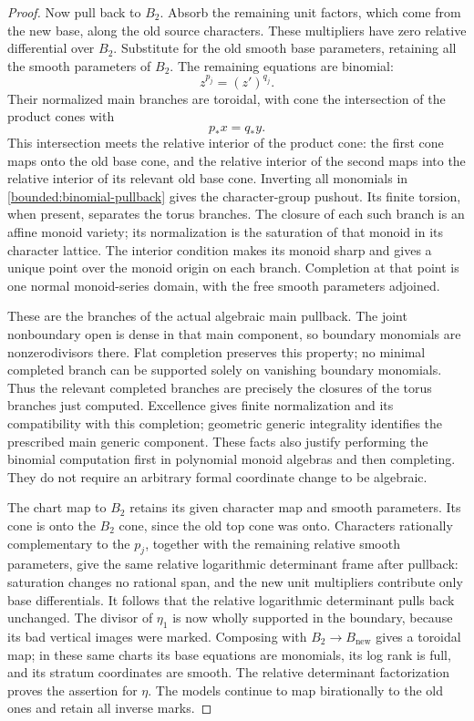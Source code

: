 \begin{proof}
Now pull back to \(B_2\).  Absorb the remaining unit factors, which come
from the new base, along the old source characters.  These multipliers
have zero relative differential over \(B_2\).  Substitute for the old
smooth base parameters, retaining all the smooth parameters of
\(B_2\).  The remaining equations are binomial:
\begin{equation}
 z^{p_j}=(z')^{q_j}.
 \label{bounded:binomial-pullback}
\end{equation}
Their normalized main branches are toroidal, with cone the intersection
of the product cones with
\[
 p_*x=q_*y.
\]
This intersection meets the relative interior of the product cone:
the first cone maps onto the old base cone, and the relative interior
of the second maps into the relative interior of its relevant old
base cone.  Inverting all monomials in
\eqref{bounded:binomial-pullback} gives the character-group pushout.
Its finite torsion, when present, separates the torus branches.  The
closure of each such branch is an affine monoid variety; its
normalization is the saturation of that monoid in its character
lattice.  The interior condition makes its monoid sharp and gives a
unique point over the monoid origin on each branch.  Completion at
that point is one normal monoid-series domain, with the free smooth
parameters adjoined.

These are the branches of the actual algebraic main pullback.  The
joint nonboundary open is dense in that main component, so boundary
monomials are nonzerodivisors there.  Flat completion preserves this
property; no minimal completed branch can be supported solely on
vanishing boundary monomials.  Thus the relevant completed branches
are precisely the closures of the torus branches just computed.
Excellence gives finite normalization and its compatibility with this
completion; geometric generic integrality identifies the prescribed
main generic component.  These facts also justify performing the
binomial computation first in polynomial monoid algebras and then
completing.  They do not require an arbitrary formal coordinate change
to be algebraic.

The chart map to \(B_2\) retains its given character map and smooth
parameters.  Its cone is onto the \(B_2\) cone, since the old top cone
was onto.  Characters rationally complementary to the \(p_j\), together
with the remaining relative smooth parameters, give the same relative
logarithmic determinant frame after pullback: saturation changes no
rational span, and the new unit multipliers contribute only base
differentials.  It follows that the relative logarithmic determinant
pulls back unchanged.  The divisor of \(\eta_1\) is now wholly
supported in the boundary, because its bad vertical images were
marked.  Composing with \(B_2\to B_{\mathrm{new}}\) gives a toroidal
map; in these same charts its base equations are monomials, its log
rank is full, and its stratum coordinates are smooth.  The relative
determinant factorization proves the assertion for \(\eta\).  The
models continue to map birationally to the old ones and retain all
inverse marks.


\end{proof}
